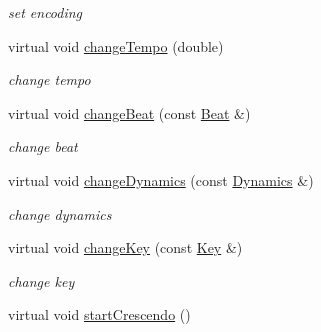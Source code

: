 \begin{DoxyCompactItemize}
\begin{DoxyCompactList}\small\item\em set encoding \end{DoxyCompactList}\item 
\hypertarget{classsinsy_1_1TempScore_ad8c1d34cebc7947b2e9e86fd02cff869}{virtual void \hyperlink{classsinsy_1_1TempScore_ad8c1d34cebc7947b2e9e86fd02cff869}{change\-Tempo} (double)}\label{classsinsy_1_1TempScore_ad8c1d34cebc7947b2e9e86fd02cff869}

\begin{DoxyCompactList}\small\item\em change tempo \end{DoxyCompactList}\item 
\hypertarget{classsinsy_1_1TempScore_aa9e3da3090018ac147517054acef3427}{virtual void \hyperlink{classsinsy_1_1TempScore_aa9e3da3090018ac147517054acef3427}{change\-Beat} (const \hyperlink{classsinsy_1_1Beat}{\-Beat} \&)}\label{classsinsy_1_1TempScore_aa9e3da3090018ac147517054acef3427}

\begin{DoxyCompactList}\small\item\em change beat \end{DoxyCompactList}\item 
\hypertarget{classsinsy_1_1TempScore_afe153ff53689214ab666d1988424bcd0}{virtual void \hyperlink{classsinsy_1_1TempScore_afe153ff53689214ab666d1988424bcd0}{change\-Dynamics} (const \hyperlink{classsinsy_1_1Dynamics}{\-Dynamics} \&)}\label{classsinsy_1_1TempScore_afe153ff53689214ab666d1988424bcd0}

\begin{DoxyCompactList}\small\item\em change dynamics \end{DoxyCompactList}\item 
\hypertarget{classsinsy_1_1TempScore_a003cbb4a65789b8448e683d13cdce460}{virtual void \hyperlink{classsinsy_1_1TempScore_a003cbb4a65789b8448e683d13cdce460}{change\-Key} (const \hyperlink{classsinsy_1_1Key}{\-Key} \&)}\label{classsinsy_1_1TempScore_a003cbb4a65789b8448e683d13cdce460}

\begin{DoxyCompactList}\small\item\em change key \end{DoxyCompactList}\item 
\hypertarget{classsinsy_1_1TempScore_a07c0e12e49f53cf22c0e113e0ba64c3d}{virtual void \hyperlink{classsinsy_1_1TempScore_a07c0e12e49f53cf22c0e113e0ba64c3d}{start\-Crescendo} ()}\label{classsinsy_1_1TempScore_a07c0e12e49f53cf22c0e113e0ba64c3d}


\end{DoxyCompactItemize}
